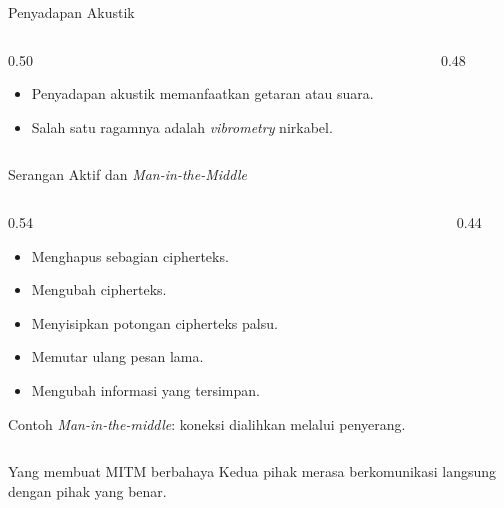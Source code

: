 \documentclass[aspectratio=169,11pt]{beamer}
\begin{document}
\begin{frame}{Penyadapan Akustik}
    \begin{columns}[T,onlytextwidth]
        \begin{column}{0.50\textwidth}
            \begin{itemize}
                \item Penyadapan akustik memanfaatkan getaran atau suara.
                \item Salah satu ragamnya adalah \textit{vibrometry}
                      nirkabel.
            \end{itemize}
        \end{column}
        \begin{column}{0.48\textwidth}
            \centering
        \end{column}
    \end{columns}
\end{frame}

\begin{frame}{Serangan Aktif dan \textit{Man-in-the-Middle}}
    \begin{columns}[T,onlytextwidth]
        \begin{column}{0.54\textwidth}
            \begin{itemize}
                \item Menghapus sebagian cipherteks.
                \item Mengubah cipherteks.
                \item Menyisipkan potongan cipherteks palsu.
                \item Memutar ulang pesan lama.
                \item Mengubah informasi yang tersimpan.
            \end{itemize}
            \begin{alertblock}{Contoh}
                \textit{Man-in-the-middle}: koneksi dialihkan melalui
                penyerang.
            \end{alertblock}
        \end{column}
        \begin{column}{0.44\textwidth}
            \centering
        \end{column}
    \end{columns}
    \vspace{0.05cm}
    \begin{block}{Yang membuat MITM berbahaya}
        Kedua pihak merasa berkomunikasi langsung dengan pihak yang benar.
    \end{block}
\end{frame}
\end{document}
